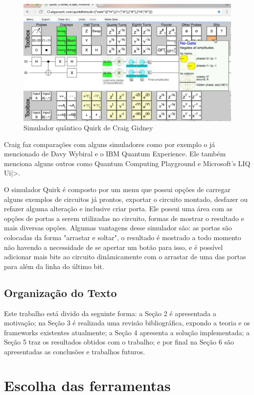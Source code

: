 \documentclass[a4paper, 12pt, oneside]{book}
\begin{document}
\begin{figure}[hbtp]
\centering
\includegraphics[scale=0.36]{quirk.jpg}
\caption{Simulador quântico Quirk de Craig Gidney}
\end{figure}

Craig faz comparações com alguns simuladores como por exemplo o já mencionado de Davy Wybiral e o IBM Quantum Experience. Ele também menciona alguns outros como Quantum Computing Playground e Microsoft's LIQ Ui|>.

O simulador Quirk é composto por um menu que possui opções de carregar alguns exemplos de circuitos já prontos, exportar o circuito montado, desfazer ou refazer alguma alteração e inclusive criar porta. Ele possui uma área com as opções de portas a serem utilizadas no circuito, formas de mostrar o resultado e mais diversas opções. Algumas vantagens desse simulador são: as portas são colocadas da forma "arrastar e soltar", o resultado é mostrado a todo momento não havendo a necessidade de se apertar um botão para isso, e é possível adicionar mais bits ao circuito dinâmicamente com o arrastar de uma das portas para além da linha do último bit.

\section{Organização do Texto}

Este trabalho está divido da seguinte forma: a Seção 2 é apresentada a motivação; na Seção 3 é realizada uma revisão bibliográfica, expondo a teoria e os frameworks existentes atualmente; a Seção 4 apresenta a solução implementada; a Seção 5 traz os resultados obtidos com o trabalho; e por final na Seção 6 são apresentadas as conclusões e trabalhos futuros.

\chapter{Escolha das ferramentas}
\thispagestyle{empty} 
\end{document}
